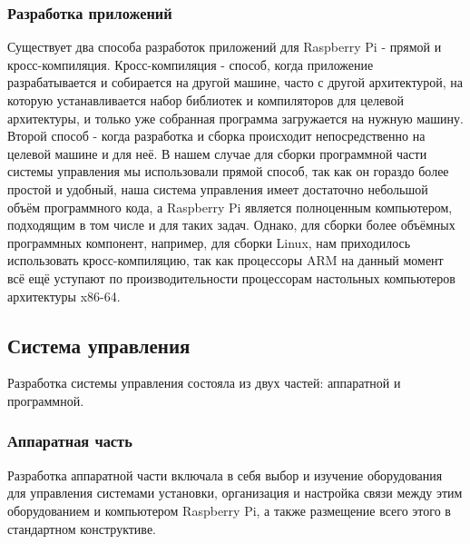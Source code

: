 \documentclass[14pt,russian,a4paper]{extarticle}
\newcounter{subsubsubsection}[subsubsection]
\begin{document}
\subsubsection{Разработка приложений}
Существует два способа разработок приложений для Raspberry Pi - прямой и кросс-компиляция. Кросс-компиляция - способ, когда приложение разрабатывается и собирается на другой машине, часто с другой архитектурой, на которую устанавливается набор библиотек и компиляторов для целевой архитектуры, и только уже собранная программа загружается на нужную машину. Второй способ - когда разработка и сборка происходит непосредственно на целевой машине и для неё. В нашем случае для сборки программной части системы управления мы использовали прямой способ, так как он гораздо более простой и удобный, наша система управления имеет достаточно небольшой объём программного кода, а Raspberry Pi является полноценным компьютером, подходящим в том числе и для таких задач. Однако, для сборки более объёмных программных компонент, например, для сборки Linux, нам приходилось использовать кросс-компиляцию, так как процессоры ARM на данный момент всё ещё уступают по производительности процессорам настольных компьютеров архитектуры x86-64.

\subsection{Система управления}
Разработка системы управления состояла из двух частей: аппаратной и программной.
\subsubsection{Аппаратная часть}
Разработка аппаратной части включала в себя выбор и изучение оборудования для управления системами установки, организация и настройка связи между этим оборудованием и компьютером Raspberry Pi, а также размещение всего этого в стандартном конструктиве.

\end{document}
